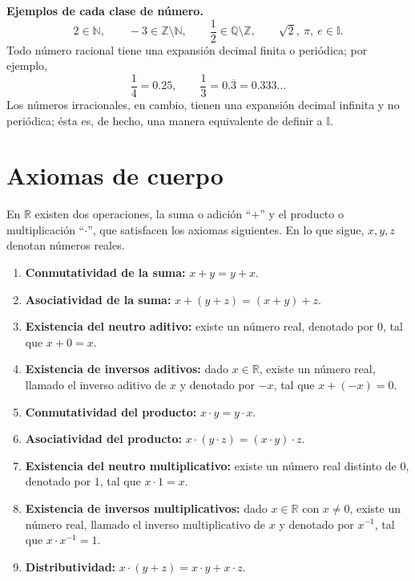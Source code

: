 \documentclass[12pt,a4paper]{book}
\begin{document}
  \begin{ejemplo}
    \textbf{Ejemplos de cada clase de número.}
    \begin{equation*}
      2\in\mathbb{N}, \qquad -3\in\mathbb{Z}\setminus\mathbb{N}, \qquad \frac{1}{2}\in\mathbb{Q}\setminus\mathbb{Z}, \qquad \sqrt{2},\ \pi,\ e \in\mathbb{I}.
    \end{equation*}
    Todo número racional tiene una expansión decimal finita o periódica; por ejemplo,
    \begin{equation*}
      \frac{1}{4}=0.25, \qquad \frac{1}{3}=0.\overline{3}=0.333\ldots
    \end{equation*}
    Los números irracionales, en cambio, tienen una expansión decimal infinita y no periódica; ésta es, de hecho, una manera equivalente de definir a $\mathbb{I}$.
  \end{ejemplo}
  
  \section{Axiomas de cuerpo}
  
  En $\mathbb{R}$ existen dos operaciones, la suma o adición ``$+$'' y el producto o multiplicación ``$\cdot$'', que satisfacen los axiomas siguientes. En lo que sigue, $x,y,z$ denotan números reales.
  
  \begin{enumerate}[leftmargin=2.4em]
    \item[\textbf{1.}] \textbf{Conmutatividad de la suma:} $x+y=y+x$.
    \item[\textbf{2.}] \textbf{Asociatividad de la suma:} $x+(y+z)=(x+y)+z$.
    \item[\textbf{3.}] \textbf{Existencia del neutro aditivo:} existe un número real, denotado por $0$, tal que $x+0=x$.
    \item[\textbf{4.}] \textbf{Existencia de inversos aditivos:} dado $x \in \mathbb{R}$, existe un número real, llamado el inverso aditivo de $x$ y denotado por $-x$, tal que $x+(-x)=0$.
    \item[\textbf{5.}] \textbf{Conmutatividad del producto:} $x\cdot y = y \cdot x$.
    \item[\textbf{6.}] \textbf{Asociatividad del producto:} $x\cdot(y\cdot z)=(x\cdot y)\cdot z$.
    \item[\textbf{7.}] \textbf{Existencia del neutro multiplicativo:} existe un número real distinto de $0$, denotado por $1$, tal que $x \cdot 1 = x$.
    \item[\textbf{8.}] \textbf{Existencia de inversos multiplicativos:} dado $x \in \mathbb{R}$ con $x \neq 0$, existe un número real, llamado el inverso multiplicativo de $x$ y denotado por $x^{-1}$, tal que $x \cdot x^{-1}=1$.
    \item[\textbf{9.}] \textbf{Distributividad:} $x\cdot(y+z) = x\cdot y + x\cdot z$.
  \end{enumerate}
  
\end{document}
